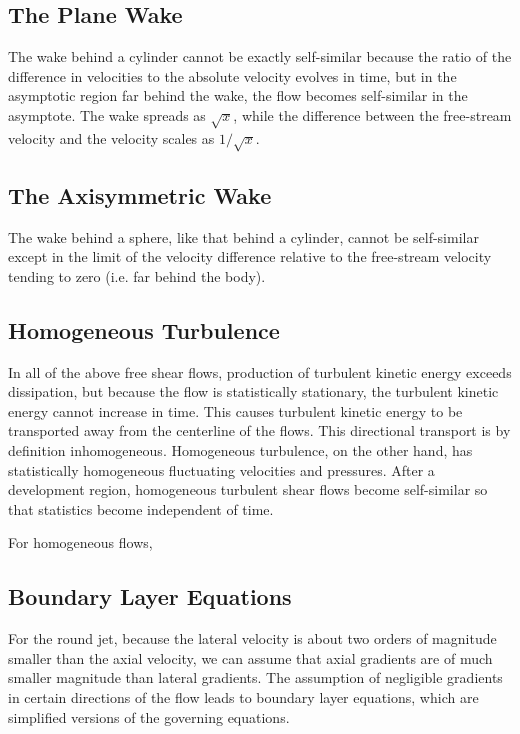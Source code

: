\documentclass[10pt]{article}
\begin{document}
\begin{flushleft}
\subsection{The Plane Wake}

The wake behind a cylinder cannot be exactly self-similar because the ratio of the difference in velocities to the absolute velocity evolves in time, but in the asymptotic region far behind the wake, the flow becomes self-similar in the asymptote. The wake spreads as \(\sqrt{x}\), while the difference between the free-stream velocity and the velocity scales as \(1/\sqrt{x}\). 

\subsection{The Axisymmetric Wake} 
The wake behind a sphere, like that behind a cylinder, cannot be self-similar except in the limit of the velocity difference relative to the free-stream velocity tending to zero (i.e. far behind the body). 

\subsection{Homogeneous Turbulence}
In all of the above free shear flows, production of turbulent kinetic energy exceeds dissipation, but because the flow is statistically stationary, the turbulent kinetic energy cannot increase in time. This causes turbulent kinetic energy to be transported away from the centerline of the flows. This directional transport is by definition inhomogeneous. Homogeneous turbulence, on the other hand, has statistically homogeneous fluctuating velocities and pressures. After a development region, homogeneous turbulent shear flows become self-similar so that statistics become independent of time. 

For homogeneous flows, 






\subsection{Boundary Layer Equations}
For the round jet, because the lateral velocity is about two orders of magnitude smaller than the axial velocity, we can assume that axial gradients are of much smaller magnitude than lateral gradients. The assumption of negligible gradients in certain directions of the flow leads to boundary layer equations, which are simplified versions of the governing equations. 



\end{flushleft}
\end{document}
